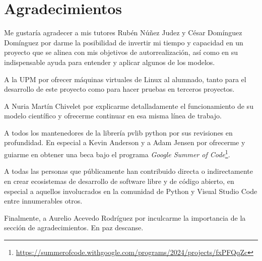 \chapter*{Agradecimientos} \label{chp:agrad}

Me gustaría agradecer a mis tutores Rubén Núñez Judez y César Domínguez Domínguez por darme la posibilidad de invertir mi tiempo y capacidad en un proyecto que se alinea con mis objetivos de autorrealización, así como en su indispensable ayuda para entender y aplicar algunos de los modelos.

A la UPM por ofrecer máquinas virtuales de Linux al alumnado, tanto para el desarrollo de este proyecto como para hacer pruebas en terceros proyectos.

A Nuria Martín Chivelet por explicarme detalladamente el funcionamiento de su modelo científico y ofrecerme continuar en esa misma línea de trabajo.

A todos los mantenedores de la librería pvlib python por sus revisiones en profundidad. En especial a Kevin Anderson y a Adam Jensen por ofrecerme y guiarme en obtener una beca bajo el programa \textit{Google Summer of Code}\footnote{\url{https://summerofcode.withgoogle.com/programs/2024/projects/fxPFQqZc}}.

A todas las personas que públicamente han contribuido directa o indirectamente en crear ecosistemas de desarrollo de software libre y de código abierto, en especial a aquellos involucrados en la comunidad de Python y Visual Studio Code entre innumerables otros.

Finalmente, a Aurelio Acevedo Rodríguez por inculcarme la importancia de la sección de agradecimientos. En paz descanse.
